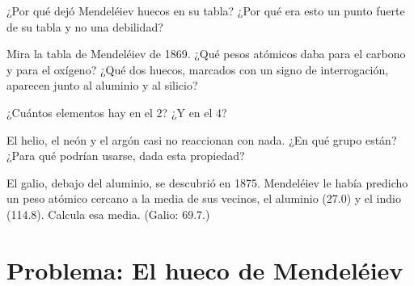 \begin{exercise}[$\star\star$]\label{exo:g9:periodic-table-first-look:8}
¿Por qué dejó Mendeléiev huecos en su tabla? ¿Por qué era esto un punto
fuerte de su tabla y no una debilidad?
\end{exercise}

\begin{exercise}[$\star\star$]\label{exo:g9:periodic-table-first-look:9}
Mira la tabla de Mendeléiev de 1869. ¿Qué pesos atómicos daba para el
carbono y para el oxígeno? ¿Qué dos huecos, marcados con un signo de
interrogación, aparecen junto al aluminio y al silicio?
\end{exercise}

\begin{exercise}[$\star\star$]\label{exo:g9:periodic-table-first-look:10}
¿Cuántos elementos hay en el  2? ¿Y en el  4?
\end{exercise}

\begin{exercise}[$\star\star\star$]\label{exo:g9:periodic-table-first-look:11}
El helio, el neón y el argón casi no reaccionan con nada. ¿En qué grupo
están? ¿Para qué podrían usarse, dada esta propiedad?
\end{exercise}

\begin{exercise}[$\star\star\star$]\label{exo:g9:periodic-table-first-look:12}
El galio, debajo del aluminio, se descubrió en 1875. Mendeléiev le
había predicho un peso atómico cercano a la media de sus vecinos, el
aluminio (27.0) y el indio (114.8). Calcula esa media. (Galio: 69.7.)
\end{exercise}

\section{Problema: El hueco de Mendeléiev}

